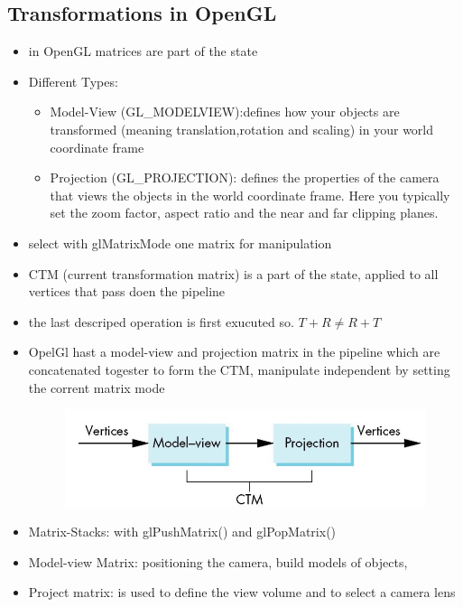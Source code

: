 \documentclass[11pt,a4paper]{article}
\begin{document}
	\subsection{Transformations in OpenGL}
	\begin{itemize}	
		\item in OpenGL matrices are part of the state
		\item Different Types:
		\begin{itemize}
			\item Model-View (GL\_MODELVIEW):defines how your objects are transformed (meaning translation,rotation and scaling) in your world coordinate frame
			\item Projection (GL\_PROJECTION): defines the properties of the camera that views the objects in the world coordinate frame. Here you typically set the zoom factor, aspect ratio and the near and far clipping planes.
		\end{itemize}
		\item select with glMatrixMode one matrix for manipulation
		\item CTM (current transformation matrix) is a part of the state, applied to all vertices that pass doen the pipeline
		\item the last descriped operation is first exucuted so. $T+R \neq R+T$
		\item OpelGl hast a model-view and projection matrix in the pipeline which are concatenated togester to form the CTM, manipulate independent by setting the corrent matrix mode 
		\begin{figure}[h]
			\hspace{2.0cm}
			\vspace{-0.6cm}
			\includegraphics[scale=0.4]{pictures/CTM.jpg}
		\end{figure}
		\item Matrix-Stacks: with glPushMatrix() and glPopMatrix()
		\item Model-view Matrix: positioning the camera, build models of objects,
		\item Project matrix: is used to define the view volume and to select a camera lens
	\end{itemize}
\end{document}
